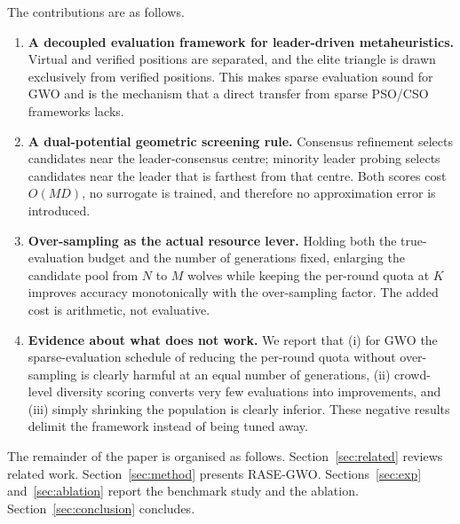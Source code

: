 The contributions are as follows.
\begin{enumerate}
  \item \textbf{A decoupled evaluation framework for leader-driven
  metaheuristics.} Virtual and verified positions are separated, and the elite
  triangle is drawn exclusively from verified positions. This makes sparse
  evaluation sound for GWO and is the mechanism that a direct transfer from
  sparse PSO/CSO frameworks lacks.
  \item \textbf{A dual-potential geometric screening rule.} Consensus
  refinement selects candidates near the leader-consensus centre; minority
  leader probing selects candidates near the leader that is farthest from that
  centre. Both scores cost $O(MD)$, no surrogate is trained, and therefore no
  approximation error is introduced.
  \item \textbf{Over-sampling as the actual resource lever.} Holding both the
  true-evaluation budget and the number of generations fixed, enlarging the
  candidate pool from $N$ to $M$ wolves while keeping the per-round quota at
  $K$ improves accuracy monotonically with the over-sampling factor. The added
  cost is arithmetic, not evaluative.
  \item \textbf{Evidence about what does not work.} We report that (i) for GWO
  the sparse-evaluation schedule of reducing the per-round quota without
  over-sampling is clearly harmful at an equal number of generations,
  (ii) crowd-level diversity scoring converts very few evaluations into
  improvements, and (iii) simply shrinking the population is clearly inferior.
  These negative results delimit the framework instead of being tuned away.
\end{enumerate}

The remainder of the paper is organised as follows.
Section~\ref{sec:related} reviews related work.
Section~\ref{sec:method} presents RASE-GWO.
Sections~\ref{sec:exp} and~\ref{sec:ablation} report the benchmark study and the
ablation.
Section~\ref{sec:conclusion} concludes.
